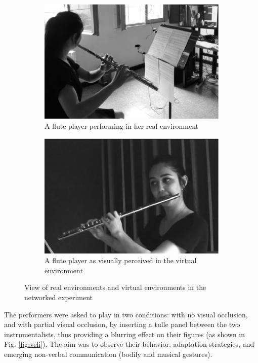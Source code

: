 \documentclass[conference]{IEEEtran}
\begin{document}
\begin{figure}[t]
\begin{subfigure}[t]{.48\columnwidth}
		\includegraphics[width=\textwidth]{img/fs.eps}
		\caption{A flute player performing in her real environment}
		\label{subfig:fs}
	\end{subfigure}
	\begin{subfigure}[t]{.48\columnwidth}
		\centering        
		\includegraphics[width=\textwidth]{img/fv.eps}
		\caption{A flute player as visually perceived in the virtual environment}
		\label{subfig:fv}
	\end{subfigure}
	
	\quad 
	\caption{View of real environments and virtual environments in the networked experiment}\label{fig:afsv}
	
\end{figure}

The performers were asked to play in two conditions: with no visual occlusion, and with partial visual occlusion, by inserting a tulle panel between the two instrumentalists, thus providing a blurring effect on their figures (as shown in Fig. \ref{fig:veli}). The aim was to observe their behavior, adaptation strategies, and emerging non-verbal communication (bodily and musical gestures).
\end{document}
